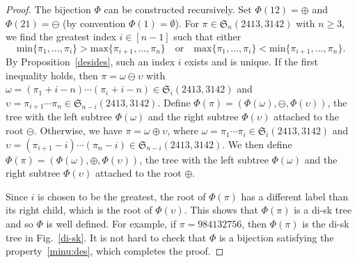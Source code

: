 \documentclass[12pt]{amsart}
\numberwithin{equation}{section}
\theoremstyle{plain}
\theoremstyle{definition}
\def\max{\mathrm{max}}
\def\min{\mathrm{min}}
\def\S{\mathfrak{S}}
\begin{document}
 \begin{proof} The bijection $\Phi$ can be constructed recursively. Set $\Phi(12)=\oplus$ and $\Phi(21)=\ominus$ (by convention $\Phi(1)=\emptyset$). For $\pi\in\S_n(2413,3142)$ with $n\geq3$, we find the greatest index $i\in[n-1]$ such that either 
 $$\min\{\pi_1,\ldots,\pi_i\}>\max\{\pi_{i+1},\ldots,\pi_n\}\quad\text{or}\quad\max\{\pi_1,\ldots,\pi_i\}<\min\{\pi_{i+1},\ldots,\pi_n\}.$$
 By Proposition~\ref{desides}, such an index $i$ exists and is unique. If the first inequality holds, then $\pi=\omega\ominus\upsilon$ with $\omega=(\pi_1+i-n)\cdots(\pi_i+i-n)\in\S_i(2413,3142)$ and $\upsilon=\pi_{i+1}\cdots\pi_{n}\in\S_{n-i}(2413,3142)$. Define $\Phi(\pi)=(\Phi(\omega),\ominus,\Phi(\upsilon))$, the tree with the left subtree $\Phi(\omega)$ and the right subtree $\Phi(\upsilon)$ attached to the root $\ominus$. Otherwise, we have $\pi=\omega\oplus\upsilon$, where $\omega=\pi_1\cdots\pi_i\in\S_i(2413,3142)$ and $\upsilon=(\pi_{i+1}-i)\cdots(\pi_{n}-i)\in\S_{n-i}(2413,3142)$. We then define $\Phi(\pi)=(\Phi(\omega),\oplus,\Phi(\upsilon))$, the tree with the left subtree $\Phi(\omega)$ and the right subtree $\Phi(\upsilon)$ attached to the root $\oplus$.
 
 Since $i$ is chosen to be the greatest,  the root of $\Phi(\pi)$ has a different label than its right child, which is the root of $\Phi(\upsilon)$. This shows that $\Phi(\pi)$ is a di-sk tree and  so $\Phi$ is well defined. For example, if $\pi=984132756$, then $\Phi(\pi)$ is the di-sk tree in Fig.~\ref{di-sk}. 
 It is not hard to check that $\Phi$ is a bijection satisfying the property~\eqref{minu:des}, which completes the proof.
 \end{proof}
 
\end{document}
